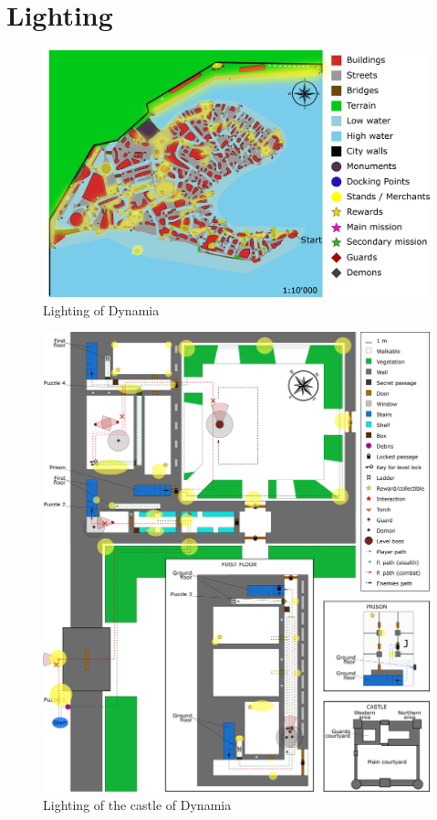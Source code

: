 \section{Lighting}

\begin{figure}[H]
  \centering
  \includegraphics[width=\textwidth]{Images/Maps/dynamiaLighting}
  \caption{Lighting of Dynamia}
\end{figure}

\begin{figure}[H]
  \centering
  \includegraphics[width=\textwidth]{Images/Maps/castleOfDynamiaLighting}
  \caption{Lighting of the castle of Dynamia}
\end{figure}

